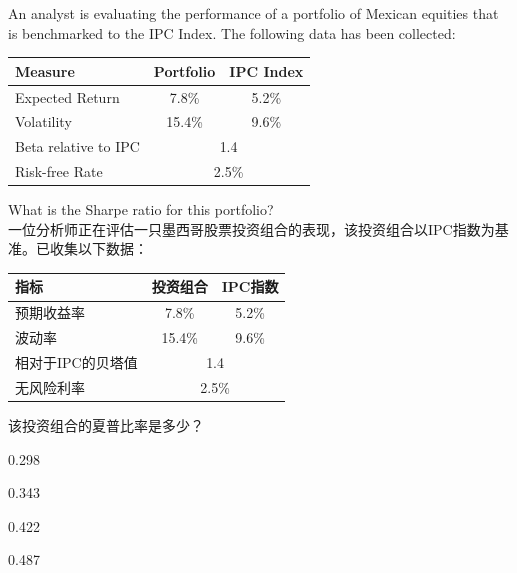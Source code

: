 \documentclass{article}
\newcounter{question} %
\begin{document}
\begin{question}
    An analyst is evaluating the performance of a portfolio of Mexican equities that is benchmarked to the IPC Index. The following data has been collected:

    \begin{center}
        \begin{tabular}{|l|c|c|}
            \hline
            \textbf{Measure} & \textbf{Portfolio} & \textbf{IPC Index} \\
            \hline
            Expected Return & 7.8\% & 5.2\% \\
            \hline
            Volatility & 15.4\% & 9.6\% \\
            \hline
            Beta relative to IPC & \multicolumn{2}{c|}{1.4} \\
            \hline
            Risk-free Rate & \multicolumn{2}{c|}{2.5\%} \\
            \hline
        \end{tabular}
    \end{center}

    What is the Sharpe ratio for this portfolio?
    \\    一位分析师正在评估一只墨西哥股票投资组合的表现，该投资组合以IPC指数为基准。已收集以下数据：

    \begin{center}
        \begin{tabular}{|l|c|c|}
            \hline
            \textbf{指标} & \textbf{投资组合} & \textbf{IPC指数} \\
            \hline
            预期收益率 & 7.8\% & 5.2\% \\
            \hline
            波动率 & 15.4\% & 9.6\% \\
            \hline
            相对于IPC的贝塔值 & \multicolumn{2}{c|}{1.4} \\
            \hline
            无风险利率 & \multicolumn{2}{c|}{2.5\%} \\
            \hline
        \end{tabular}
    \end{center}

    该投资组合的夏普比率是多少？
\end{question}

\begin{choices}
    \item 0.298
    \item 0.343
    \item 0.422
    \item 0.487
\end{choices}
\end{document}
